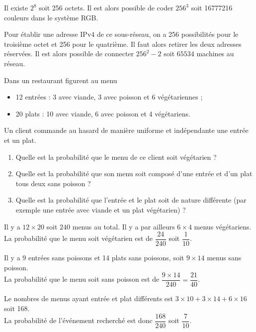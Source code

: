 \documentclass[11pt,fleqn, openany]{book} %
\begin{document}
\begin{solution}Il existe $2^8$ soit 256 octets. Il est alors possible de coder $256^3$ soit 16777216 couleurs dans le système RGB.

Pour établir une adresse IPv4 de ce sous-réseau, on a 256 possibilités pour le troisième octet et 256 pour le quatrième. Il faut alors retirer les deux adresses réservées. Il est alors possible de connecter $256^2-2$ soit $65534$ machines au réseau.\end{solution}




\begin{exercise}[topic=comb01]Dans un restaurant figurent au menu
\begin{itemize}
\item 12 entrées : 3 avec viande, 3 avec poisson et 6 végétariennes ;
\item 20 plats : 10 avec viande, 6 avec poisson et 4 végétariens.
\end{itemize}
Un client commande au hasard de manière uniforme et indépendante une entrée et un plat.
\begin{enumerate}
\item Quelle est la probabilité que le menu de ce client soit végétarien ?
\item Quelle est la probabilité que son menu soit composé d'une entrée et d'un plat tous deux sans poisson ?
\item Quelle est la probabilité que l'entrée et le plat soit de nature différente (par exemple une entrée avec viande et un plat végétarien) ?
\end{enumerate}\end{exercise}

\begin{solution}Il y a $12 \times 20$ soit $240$ menus au total. Il y a par ailleurs $6 \times 4$ menus végétariens. \\La probabilité que le menu soit végétarien est de $\dfrac{24}{240}$ soit $\dfrac{1}{10}$.

Il y a 9 entrées sans poissons et 14 plats sans poissons, soit $9\times 14$ menus sans poisson. \\La probabilité que le menu soit sans poisson est de $\dfrac{9\times 14}{240}=\dfrac{21}{40}$.

Le nombres de menus ayant entrée et plat différents est $3 \times 10+3 \times 14 +6 \times 16$ soit 168. \\La probabilité de l'événement recherché est donc $\dfrac{168}{240}$ soit $\dfrac{7}{10}$.\end{solution}
\end{document}
